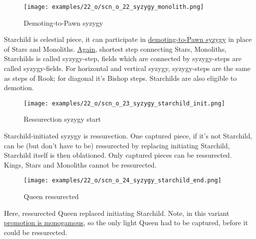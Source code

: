 \vspace*{-1.3\baselineskip}
\noindent
\begin{figure}[!h]
\texttt{[image: examples/22\_o/scn\_o\_22\_syzygy\_monolith.png]}
\caption{Demoting-to-Pawn syzygy}
\label{fig:scn_o_22_syzygy_monolith}
\end{figure}

Starchild is celestial piece, it can participate in
\hyperref[fig:scn_d_15_syzygy_2_stars_init]{demoting-to-Pawn syzygy} in place of Stars and Monoliths.
\hyperref[fig:scn_d_17_syzygy_2_monoliths_init]{Again}, shortest step connecting Stars, Monoliths,
Starchilds is called syzygy-step, fields which are connected by syzygy-steps are called syzygy-fields.
For horizontal and vertical syzygy, syzygy-steps are the same as steps of Rook; for diagonal it’s
Bishop steps. Starchilds are also eligible to demotion.

\clearpage %

\vspace*{-2.1\baselineskip}
\noindent
\begin{figure}[!h]
\texttt{[image: examples/22\_o/scn\_o\_23\_syzygy\_starchild\_init.png]}
\caption{Ressurection syzygy start}
\label{fig:scn_o_23_syzygy_starchild_init}
\end{figure}

Starchild-initiated syzygy is ressurection. One captured piece, if it's not Starchild, can be (but
don't have to be) ressurected by replacing initiating Starchild, Starchild itself is then oblationed.
Only captured pieces can be ressurected. Kings, Stars and Monoliths cannot be ressurected.

\clearpage %

\vspace*{-2.1\baselineskip}
\noindent
\begin{figure}[!h]
\texttt{[image: examples/22\_o/scn\_o\_24\_syzygy\_starchild\_end.png]}
\caption{Queen ressurected}
\label{fig:scn_o_24_syzygy_starchild_end}
\end{figure}

Here, ressurected Queen replaced initiating Starchild. Note, in this variant
\hyperref[sec:One/Promotion]{promotion is monogamous}, so the only light Queen
had to be captured, before it could be ressurected.

